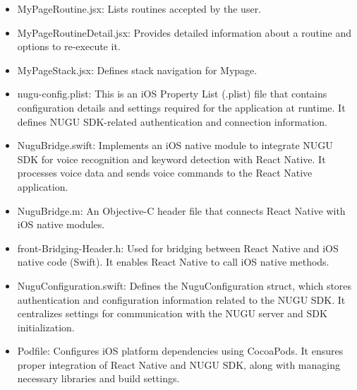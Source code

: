 \documentclass[conference]{IEEEtran}
\begin{document}
\begin{enumerate}[label=\arabic*]
\begin{itemize}[label=-]
        \item MyPageRoutine.jsx: Lists routines accepted by the user.
        \vspace{0.7em}

        \item MyPageRoutineDetail.jsx: Provides detailed information about a routine and options to re-execute it.
        \vspace{0.7em}

        \item MyPageStack.jsx: Defines stack navigation for Mypage. 
        \vspace{0.7em}

        \item nugu-config.plist: This is an iOS Property List (.plist) file that contains configuration details and settings required for the application at runtime. It defines NUGU SDK-related authentication and connection information.
        \vspace{0.7em}

        \item NuguBridge.swift: Implements an iOS native module to integrate NUGU SDK for voice recognition and keyword detection with React Native. It processes voice data and sends voice commands to the React Native application.
        \vspace{0.7em}

        \item NuguBridge.m: An Objective-C header file that connects React Native with iOS native modules.
        \vspace{0.7em}

        \item front-Bridging-Header.h: Used for bridging between React Native and iOS native code (Swift). It enables React Native to call iOS native methods.
        \vspace{0.7em}

        \item NuguConfiguration.swift: Defines the NuguConfiguration struct, which stores authentication and configuration information related to the NUGU SDK. It centralizes settings for communication with the NUGU server and SDK initialization.
        \vspace{0.7em}

        \item Podfile: Configures iOS platform dependencies using CocoaPods. It ensures proper integration of React Native and NUGU SDK, along with managing necessary libraries and build settings.
    \end{itemize}

    \vspace{1em}

\end{enumerate}
\end{document}
